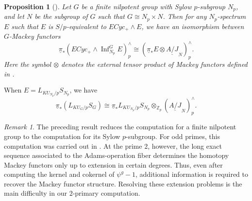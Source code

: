 \documentclass{amsart}
\theoremstyle{plain}
\newtheorem{proposition}[theorem]{Proposition}
\theoremstyle{definition}
\theoremstyle{remark}
\newtheorem{remark}[theorem]{Remark}
\begin{document}
\begin{proposition}[]\label{IntroProp: Z graded homotopy Mackey functor of ECyc inf}
    Let $G$ be a finite nilpotent group with Sylow $p$-subgroup $N_p$, and let $N$ be the subgroup of $G$ such that $G\cong N_p\times N$. Then for any $N_p$-spectrum $E$ such that $E$ is $S/p$-equivalent to $ECyc_+ \wedge E$, we have an isomorphism between $G$-Mackey functors
    \[ \underline{\pi}_*(ECyc_+\wedge \operatorname{Inf}_{N_p}^G E)_p^\wedge\cong (\underline{\pi}_* E \otimes \underline{A/J}_N)_p^\wedge. \] 
    Here the symbol $\otimes$ denotes the external tensor product of Mackey functors defined in .
\end{proposition}



    When $E=L_{KU_{N_p}/p}S_{N_p}$, we have
    \[\underline{\pi}_*(L_{KU_G/p}S_G)\cong \underline{\pi}_*L_{KU_{N_p}/p}S_{N_p}\otimes_{\mathbb{Z}_p} (\underline{A/J}_N)_p^\wedge.\]
    
    \begin{remark}
    The preceding result reduces the computation for a finite nilpotent group to the computation for its Sylow $p$-subgroup. For odd primes, this computation was carried out in \cite{carawan2023homotopy}. At the prime $2$, however, the long exact sequence associated to the Adams-operation fiber determines the homotopy Mackey functors only up to extension in certain degrees. Thus, even after computing the kernel and cokernel of $\psi^g-1$, additional information is required to recover the Mackey functor structure. Resolving these extension problems is the main difficulty in our $2$-primary computation.
    \end{remark}
\end{document}
